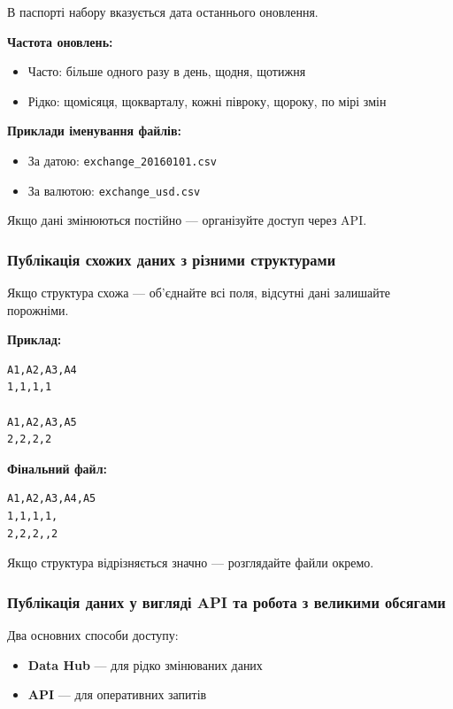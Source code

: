 В паспорті набору вказується дата останнього оновлення.

\textbf{Частота оновлень:}

\begin{itemize}
    \item Часто: більше одного разу в день, щодня, щотижня
    \item Рідко: щомісяця, щокварталу, кожні півроку, щороку, по мірі змін
\end{itemize}

\textbf{Приклади іменування файлів:}

\begin{itemize}
    \item За датою: \texttt{exchange\_20160101.csv}
    \item За валютою: \texttt{exchange\_usd.csv}
\end{itemize}

Якщо дані змінюються постійно — організуйте доступ через API.

\subsubsection{Публікація схожих даних з різними структурами}

Якщо структура схожа — об'єднайте всі поля, відсутні дані залишайте порожніми.

\textbf{Приклад:}

\begin{verbatim}
A1,A2,A3,A4
1,1,1,1

A1,A2,A3,A5
2,2,2,2
\end{verbatim}

\textbf{Фінальний файл:}

\begin{verbatim}
A1,A2,A3,A4,A5
1,1,1,1,
2,2,2,,2
\end{verbatim}

Якщо структура відрізняється значно — розглядайте файли окремо.

\subsubsection{Публікація даних у вигляді API та робота з великими обсягами}

Два основних способи доступу:

\begin{itemize}
    \item \textbf{Data Hub} — для рідко змінюваних даних
    \item \textbf{API} — для оперативних запитів
\end{itemize}

